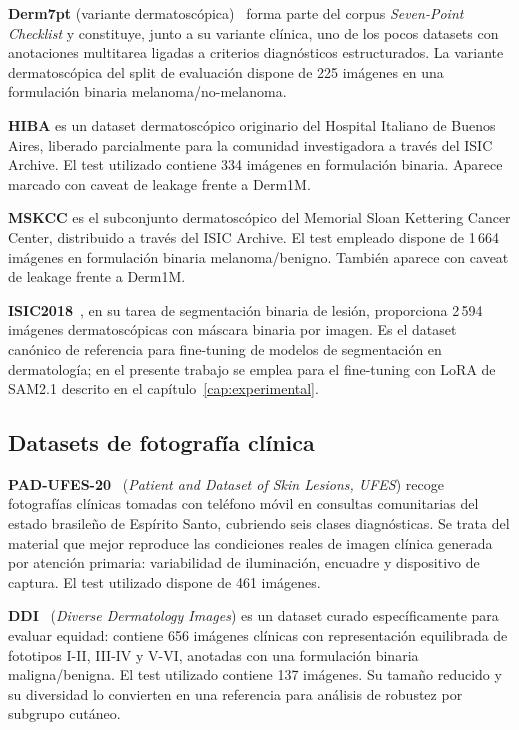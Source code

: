 \textbf{Derm7pt} (variante dermatoscópica)~\cite{kawahara2019} forma
parte del corpus \emph{Seven-Point Checklist} y constituye, junto a
su variante clínica, uno de los pocos datasets con anotaciones
multitarea ligadas a criterios diagnósticos estructurados. La
variante dermatoscópica del split de evaluación dispone de 225
imágenes en una formulación binaria melanoma/no-melanoma.

\textbf{HIBA} es un dataset dermatoscópico originario del Hospital
Italiano de Buenos Aires, liberado parcialmente para la comunidad
investigadora a través del ISIC Archive. El test utilizado contiene
334 imágenes en formulación binaria. Aparece marcado con caveat de
leakage frente a Derm1M.

\textbf{MSKCC} es el subconjunto dermatoscópico del Memorial Sloan
Kettering Cancer Center, distribuido a través del ISIC Archive. El
test empleado dispone de 1\,664 imágenes en formulación binaria
melanoma/benigno. También aparece con caveat de leakage frente a
Derm1M.

\textbf{ISIC2018}~\cite{isic2018}, en su tarea de segmentación
binaria de lesión, proporciona 2\,594 imágenes dermatoscópicas con
máscara binaria por imagen. Es el dataset canónico de referencia para
fine-tuning de modelos de segmentación en dermatología; en el
presente trabajo se emplea para el fine-tuning con LoRA de SAM2.1
descrito en el capítulo~\ref{cap:experimental}.

\subsection{Datasets de fotografía clínica}
\label{sec:datasets-clinicos}

\textbf{PAD-UFES-20}~\cite{padufes} (\emph{Patient and Dataset of
Skin Lesions, UFES}) recoge fotografías clínicas tomadas con
teléfono móvil en consultas comunitarias del estado brasileño de
Espírito Santo, cubriendo seis clases diagnósticas. Se trata del
material que mejor reproduce las condiciones reales de imagen
clínica generada por atención primaria: variabilidad de iluminación,
encuadre y dispositivo de captura. El test utilizado dispone de 461
imágenes.

\textbf{DDI}~\cite{ddi} (\emph{Diverse Dermatology Images}) es un
dataset curado específicamente para evaluar equidad: contiene 656
imágenes clínicas con representación equilibrada de fototipos I-II,
III-IV y V-VI, anotadas con una formulación binaria maligna/benigna.
El test utilizado contiene 137 imágenes. Su tamaño reducido y su
diversidad lo convierten en una referencia para análisis de
robustez por subgrupo cutáneo.

